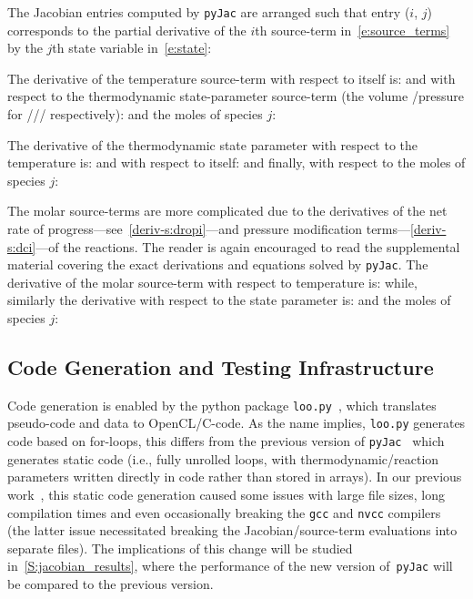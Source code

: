 \documentclass[12pt,number,sort&compress,preprint]{elsarticle}
\begin{document}
The Jacobian entries computed by \texttt{pyJac} are arranged such that entry ($i$, $j$) corresponds to the partial derivative of the $i$th source-term in~\cref{e:source_terms} by the $j$th state variable in~\cref{e:state}:

The derivative of the temperature source-term with respect to itself is:
and with respect to the thermodynamic state-parameter source-term (the volume \slash pressure for \conp/\slash\conv/ respectively):
and the moles of species $j$:

The derivative of the thermodynamic state parameter with respect to the temperature is:
and with respect to itself:
and finally, with respect to the moles of species $j$:

The molar source-terms are more complicated due to the derivatives of the net rate of progress---see~\cref{deriv-s:dropi}---and pressure modification terms---\cref{deriv-s:dci}---of the reactions.
The reader is again encouraged to read the supplemental material covering the exact derivations and equations solved by \texttt{pyJac}.
The derivative of the molar source-term with respect to temperature is:
while, similarly the derivative with respect to the state parameter is:
and the moles of species $j$:

\subsection{Code Generation and Testing Infrastructure}
\label{s:unittest}
Code generation is enabled by the python package \texttt{loo.py}~\cite{kloeckner_loopy_2014}, which translates pseudo-code and data to OpenCL\slash C-code.
As the name implies, \texttt{loo.py} generates code based on for-loops, this differs from the previous version of \texttt{pyJac}~\cite{pyjac16} which generates static code (i.e., fully unrolled loops, with thermodynamic\slash reaction parameters written directly in code rather than stored in arrays).
In our previous work~\cite{Niemeyer:2016aa}, this static code generation caused some issues with large file sizes, long compilation times and even occasionally breaking the \texttt{gcc} and \texttt{nvcc} compilers (the latter issue necessitated breaking the Jacobian\slash source-term evaluations into separate files).
The implications of this change will be studied in~\cref{S:jacobian_results}, where the performance of the new version of~\texttt{pyJac} will be compared to the previous version.
\end{document}
